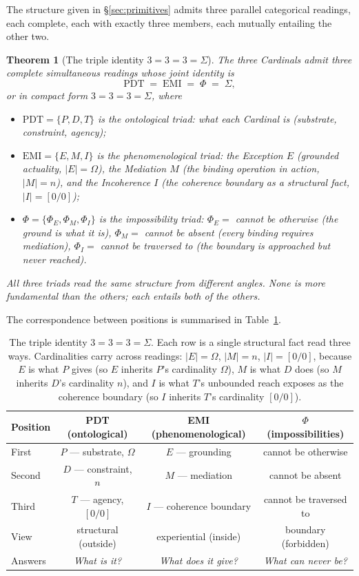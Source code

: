 \documentclass[11pt,a4paper]{article}
\newtheorem{theorem}{Theorem}[section]
\theoremstyle{definition}
\theoremstyle{remark}
\begin{document}
The structure given in \S\ref{sec:primitives} admits three parallel categorical readings, each complete, each with exactly three members, each mutually entailing the other two.

\begin{theorem}[The triple identity $3=3=3=\Sigma$]\label{thm:triads}
The three Cardinals admit three complete simultaneous readings whose joint identity is
\[
\boxed{\;\mathrm{PDT} \;=\; \mathrm{EMI} \;=\; \Phi \;=\; \Sigma,\;}
\]
or in compact form $3=3=3=\Sigma$, where
\begin{itemize}[leftmargin=*]
\item $\mathrm{PDT} = \{P,D,T\}$ is the \emph{ontological} triad: what each Cardinal is (substrate, constraint, agency);
\item $\mathrm{EMI} = \{E,M,I\}$ is the \emph{phenomenological} triad: the Exception $E$ (grounded actuality, $|E|=\Omega$), the Mediation $M$ (the binding operation in action, $|M|=n$), and the Incoherence $I$ (the coherence boundary as a structural fact, $|I|=[0/0]$);
\item $\Phi = \{\Phi_{E},\Phi_{M},\Phi_{I}\}$ is the \emph{impossibility} triad: $\Phi_{E} = $ \textit{cannot be otherwise} (the ground is what it is), $\Phi_{M} = $ \textit{cannot be absent} (every binding requires mediation), $\Phi_{I} = $ \textit{cannot be traversed to} (the boundary is approached but never reached).
\end{itemize}
All three triads read the same structure from different angles. None is more fundamental than the others; each entails both of the others.
\end{theorem}

The correspondence between positions is summarised in Table~\ref{tab:triads}.

\begin{table}[h]
\centering
\begin{tabular}{@{}l c c c@{}}
\toprule
Position & PDT (ontological) & EMI (phenomenological) & $\Phi$ (impossibilities)\\
\midrule
First & $P$ --- substrate, $\Omega$ & $E$ --- grounding & cannot be otherwise\\
Second & $D$ --- constraint, $n$ & $M$ --- mediation & cannot be absent\\
Third & $T$ --- agency, $[0/0]$ & $I$ --- coherence boundary & cannot be traversed to\\
\addlinespace
View & structural (outside) & experiential (inside) & boundary (forbidden)\\
Answers & \textit{What is it?} & \textit{What does it give?} & \textit{What can never be?}\\
\bottomrule
\end{tabular}
\caption{The triple identity $3=3=3=\Sigma$. Each row is a single structural fact read three ways. Cardinalities carry across readings: $|E|=\Omega$, $|M|=n$, $|I|=[0/0]$, because $E$ is what $P$ gives (so $E$ inherits $P$'s cardinality $\Omega$), $M$ is what $D$ does (so $M$ inherits $D$'s cardinality $n$), and $I$ is what $T$'s unbounded reach exposes as the coherence boundary (so $I$ inherits $T$'s cardinality $[0/0]$).}
\label{tab:triads}
\end{table}
\end{document}
